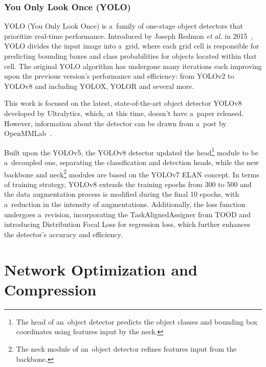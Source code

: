 \subsubsection{You Only Look Once (YOLO)}

YOLO (You Only Look Once) is a~family of one-stage object detectors that
prioritize real-time performance. Introduced by Joseph Redmon \textit{et al.} in
2015~\cite{Redmon2015}, YOLO divides the input image into a~grid, where each
grid cell is responsible for predicting bounding boxes and class probabilities
for objects located within that cell. The original YOLO algorithm has undergone
many iterations each improving upon the previous version's performance and
efficiency: from YOLOv2 to YOLOv8 and including YOLOX, YOLOR and several more.

This work is focused on the latest, state-of-the-art object
detector YOLOv8~\cite{YOLOv8} developed by Ultralytics, which, at this time, doesn't
have a~paper released. However, information about the detector can be drawn from
a~post by OpenMMLab~\cite{YOLOv8OpenMMLab}.

Built upon the YOLOv5, the YOLOv8 detector updated the head\footnote{The head of
an~object detector predicts the object classes and bounding box coordinates
using features input by the neck.} module to be a~decoupled one, separating the
classification and detection heads, while the new backbone and neck\footnote{The
neck module of an~object detector refines features input from the backbone.}
modules are based on the YOLOv7 ELAN concept. In terms of training strategy,
YOLOv8 extends the training epochs from 300 to 500 and the data augmentation
process is modified during the final 10 epochs, with a~reduction in the
intensity of augmentations. Additionally, the loss function undergoes
a~revision, incorporating the TaskAlignedAssigner from TOOD and introducing
Distribution Focal Loss for regression loss, which further enhances
the detector's accuracy and efficiency.






\section{Network Optimization and Compression}

